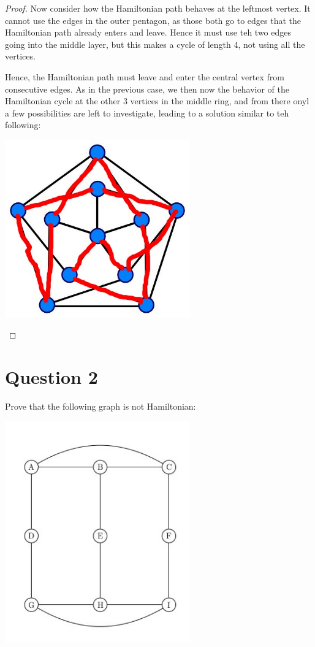 \documentclass{amsart}
\begin{document}
\begin{proof}
Now consider how the Hamiltonian path behaves at the leftmost vertex.  It cannot use the edges in the outer pentagon, as those both go to edges that the Hamiltonian path already enters and leave.  Hence it must use teh two edges going into the middle layer, but this makes a cycle of length 4, not using all the vertices.  

Hence, the Hamiltonian path must leave and enter the central vertex from consecutive edges.  As in the previous case, we then now the behavior of the Hamiltonian cycle at the other 3 vertices in the middle ring, and from there onyl a few possibilities are left to investigate, leading to a solution similar to teh following:


\begin{center} 
\includegraphics[width=8cm]{PS1P1Sol.jpg}
\end{center}



\end{proof}

\section{Question 2}
Prove that the following graph is not Hamiltonian:


\begin{center} 
\includegraphics[width=8cm]{ProblemSet1Graph2.jpg}
\end{center}
\end{document}
